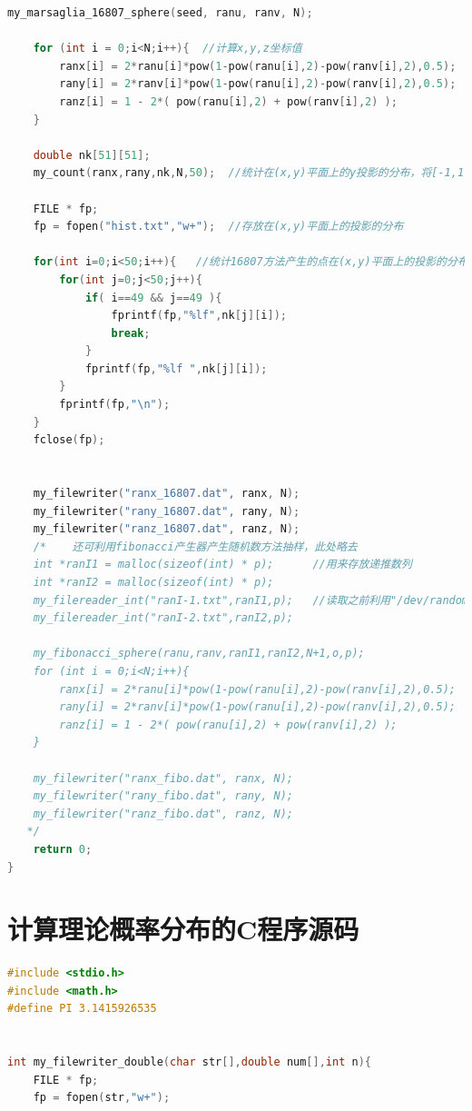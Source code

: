 \documentclass[a4paper,11pt]{article}
\begin{document}
\begin{appendices}
\begin{lstlisting}[language = C]
    my_marsaglia_16807_sphere(seed, ranu, ranv, N);
    
    for (int i = 0;i<N;i++){  //计算x,y,z坐标值
        ranx[i] = 2*ranu[i]*pow(1-pow(ranu[i],2)-pow(ranv[i],2),0.5);
        rany[i] = 2*ranv[i]*pow(1-pow(ranu[i],2)-pow(ranv[i],2),0.5);
        ranz[i] = 1 - 2*( pow(ranu[i],2) + pow(ranv[i],2) );
    }
    
    double nk[51][51];
    my_count(ranx,rany,nk,N,50);  //统计在(x,y)平面上的y投影的分布，将[-1,1]*[-1,1]区间剖分为50*50个小区间统计
    
    FILE * fp;
    fp = fopen("hist.txt","w+");  //存放在(x,y)平面上的投影的分布
    
    for(int i=0;i<50;i++){   //统计16807方法产生的点在(x,y)平面上的投影的分布
        for(int j=0;j<50;j++){
            if( i==49 && j==49 ){
                fprintf(fp,"%lf",nk[j][i]);
                break;
            }
            fprintf(fp,"%lf ",nk[j][i]);
        }
        fprintf(fp,"\n");
    }
    fclose(fp);
    
    
    my_filewriter("ranx_16807.dat", ranx, N);
    my_filewriter("rany_16807.dat", rany, N);
    my_filewriter("ranz_16807.dat", ranz, N);
    /*    还可利用fibonacci产生器产生随机数方法抽样，此处略去
    int *ranI1 = malloc(sizeof(int) * p);      //用来存放递推数列
    int *ranI2 = malloc(sizeof(int) * p);
    my_filereader_int("ranI-1.txt",ranI1,p);   //读取之前利用"/dev/random"产生的初始随机数组
    my_filereader_int("ranI-2.txt",ranI2,p);
   
    my_fibonacci_sphere(ranu,ranv,ranI1,ranI2,N+1,o,p);
    for (int i = 0;i<N;i++){
        ranx[i] = 2*ranu[i]*pow(1-pow(ranu[i],2)-pow(ranv[i],2),0.5);
        rany[i] = 2*ranv[i]*pow(1-pow(ranu[i],2)-pow(ranv[i],2),0.5);
        ranz[i] = 1 - 2*( pow(ranu[i],2) + pow(ranv[i],2) );
    }

    my_filewriter("ranx_fibo.dat", ranx, N);
    my_filewriter("rany_fibo.dat", rany, N);
    my_filewriter("ranz_fibo.dat", ranz, N);
   */
    return 0;
}
\end{lstlisting}


\section{计算理论概率分布的C程序源码}

\begin{lstlisting}[language = C]
#include <stdio.h>
#include <math.h>
#define PI 3.1415926535


int my_filewriter_double(char str[],double num[],int n){
    FILE * fp;
    fp = fopen(str,"w+");
    

\end{lstlisting}
\end{appendices}
\end{document}
